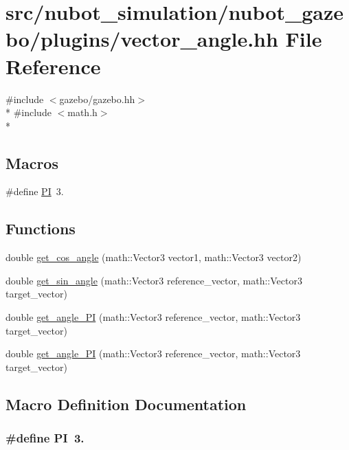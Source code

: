 \hypertarget{vector__angle_8hh}{\section{src/nubot\-\_\-simulation/nubot\-\_\-gazebo/plugins/vector\-\_\-angle.hh File Reference}
\label{vector__angle_8hh}
}
{\ttfamily \#include $<$gazebo/gazebo.\-hh$>$}\\*
{\ttfamily \#include $<$math.\-h$>$}\\*
\subsection*{Macros}
\begin{DoxyCompactItemize}
\item 
\#define \hyperlink{vector__angle_8hh_a598a3330b3c21701223ee0ca14316eca}{P\-I}~3.
\end{DoxyCompactItemize}
\subsection*{Functions}
\begin{DoxyCompactItemize}
\item 
double \hyperlink{vector__angle_8hh_a1b9926f16acb5f592b62a9432a01faaa}{get\-\_\-cos\-\_\-angle} (math\-::\-Vector3 vector1, math\-::\-Vector3 vector2)
\item 
double \hyperlink{vector__angle_8hh_a3f4b439e11cba4b39e181f4482aaf320}{get\-\_\-sin\-\_\-angle} (math\-::\-Vector3 reference\-\_\-vector, math\-::\-Vector3 target\-\_\-vector)
\item 
double \hyperlink{vector__angle_8hh_adcfcbae1bee7086c33410a71b2f2e729}{get\-\_\-angle\-\_\-\-P\-I} (math\-::\-Vector3 reference\-\_\-vector, math\-::\-Vector3 target\-\_\-vector)
\item 
double \hyperlink{vector__angle_8hh_ae998ba9cb6fe53aee83ee816110b4e4f}{get\-\_\-angle\-\_\-P\-I} (math\-::\-Vector3 reference\-\_\-vector, math\-::\-Vector3 target\-\_\-vector)
\end{DoxyCompactItemize}


\subsection{Macro Definition Documentation}
\hypertarget{vector__angle_8hh_a598a3330b3c21701223ee0ca14316eca}{
\subsubsection[{P\-I}]{\setlength{\rightskip}{0pt plus 5cm}\#define P\-I~3.}}\label{vector__angle_8hh_a598a3330b3c21701223ee0ca14316eca}


